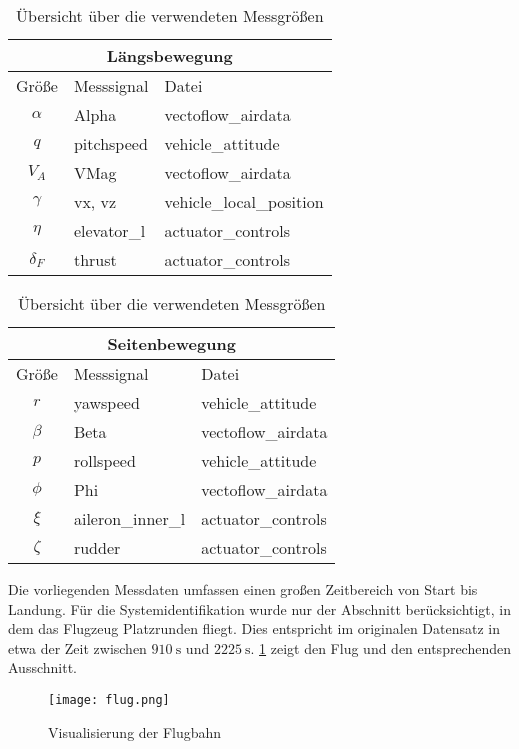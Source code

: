 \begin{table}[h!]
	\centering
	\caption{Übersicht über die verwendeten Messgrößen}
	\label{tab:messgroessen}
	\begin{tabular}{@{} cll @{}} 
		\toprule
		\multicolumn{3}{c}{Längsbewegung}\\
		\midrule
		Größe 	&Messsignal &Datei\\
		\midrule
		$ \alpha $	&Alpha &vectoflow\_airdata\\
		$ q $	&pitchspeed &vehicle\_attitude\\
		$ V_A $	&VMag &vectoflow\_airdata\\
		$ \gamma $ &vx, vz &vehicle\_local\_position\\
		$ \eta $ &elevator\_l &actuator\_controls\\
		$ \delta_F $ &thrust &actuator\_controls\\
		\bottomrule
	\end{tabular}
	\begin{tabular}{@{} cll @{}} 
		\toprule
		\multicolumn{3}{c}{Seitenbewegung}\\
		\midrule
		Größe 	&Messsignal &Datei\\
		\midrule
		$ r $	&yawspeed &vehicle\_attitude\\
		$ \beta $	&Beta &vectoflow\_airdata\\
		$ p $	&rollspeed &vehicle\_attitude\\
		$ \phi $ &Phi &vectoflow\_airdata\\
		$ \xi $ &aileron\_inner\_l &actuator\_controls\\
		$ \zeta $ &rudder &actuator\_controls\\
		\bottomrule
	\end{tabular}
\end{table}

Die vorliegenden Messdaten umfassen einen großen Zeitbereich von Start bis Landung. Für die Systemidentifikation wurde nur 
der Abschnitt berücksichtigt, in dem das Flugzeug Platzrunden fliegt. Dies entspricht im originalen Datensatz in etwa der 
Zeit zwischen $ \SI{910}{\second} $ und $ \SI{2225}{\second} $. \cref{fig:flug} zeigt den Flug und den entsprechenden 
Ausschnitt.

\begin{figure}[h!]
	\centering
	\texttt{[image: flug.png]}
	\caption{Visualisierung der Flugbahn}
	\label{fig:flug}
\end{figure}

